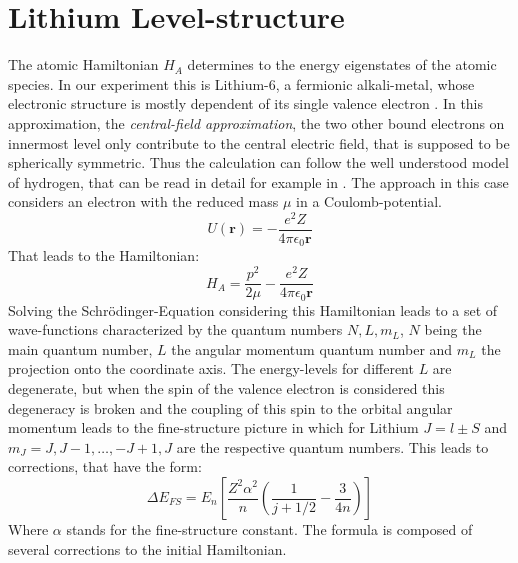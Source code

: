 \section{Lithium Level-structure}
The atomic Hamiltonian $H_A$ determines to the energy eigenstates of the atomic species. In our experiment this is Lithium-6, a fermionic alkali-metal, whose electronic structure is mostly dependent of its single valence electron \cite{gehm}. In this approximation, the \textit{central-field approximation}, the two other bound electrons on innermost level only contribute to the central electric field, that is supposed to be spherically symmetric. Thus the calculation can follow the well understood model of hydrogen, that can be read in detail for example in \cite{demtroder}. The approach in this case considers an electron with the reduced mass $\mu$ in a Coulomb-potential.
\begin{equation}
U(\boldsymbol{r})=-\frac{e^2Z}{4\pi\epsilon_0\boldsymbol{r}}
\end{equation}
That leads to the Hamiltonian:
\begin{equation}
H_A=\frac{p^2}{2\mu}-\frac{e^2Z}{4\pi\epsilon_0\boldsymbol{r}}
\end{equation}
Solving the Schrödinger-Equation considering this Hamiltonian leads to a set of wave-functions characterized by the quantum numbers $N,L,m_L$, $N$ being the main quantum number, $L$ the angular momentum quantum number and $m_L$ the projection onto the coordinate axis. The energy-levels for different $L$ are degenerate, but when the spin of the valence electron is considered this degeneracy is broken and the coupling of this spin to the orbital angular momentum leads to the fine-structure picture in which for Lithium $J=l\pm S$  and $m_J=J,J-1,\dots,-J+1,J$ are the respective quantum numbers. This leads to corrections, that have the form:
\begin{equation}
\Delta E_{FS}=E_n\left[\frac{Z^2\alpha^2}{n}\left(\frac{1}{j+1/2}-\frac{3}{4n}\right)\right]
\end{equation}
Where $\alpha$ stands for the fine-structure constant. The formula is composed of several corrections to the initial Hamiltonian. 
